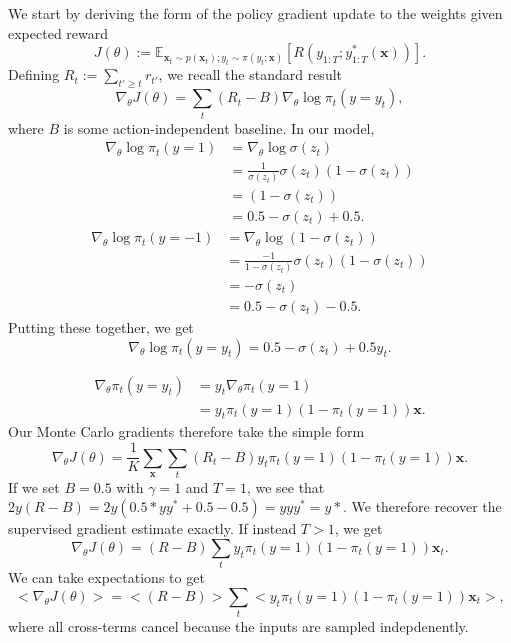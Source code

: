\documentclass{article}
\renewcommand\b\bm
\renewcommand\b\bm
\begin{document}
We start by deriving the form of the policy gradient update to the weights given expected reward
\begin{equation}
    J(\theta) := \mathbb{E}_{\b{x}_t \sim p(\b{x}_t); y_t \sim \pi(y_t; \b{x})} \left [ R(y_{1:T} ; y^*_{1:T}(\b{x})) \right ].
\end{equation}
Defining $R_t := \sum_{t' \geq t} r_{t'}$, we recall the standard result
\begin{equation}
    \nabla_\theta J(\theta) = \sum_t (R_t - B) \nabla_\theta \log \pi_t(y = y_t),
\end{equation}
where $B$ is some action-independent baseline.
In our model,
\begin{align}
    \nabla_\theta \log \pi_t(y = 1) &= \nabla_\theta \log \sigma(z_t) \\
    &= \frac{1}{\sigma(z_t)} \sigma(z_t) (1-\sigma(z_t))\\
    &=  (1-\sigma(z_t))\\
    &= 0.5 -\sigma(z_t) + 0.5.
\end{align}
\begin{align}
    \nabla_\theta \log \pi_t(y = -1) &= \nabla_\theta \log (1 - \sigma(z_t))\\
    &= \frac{-1}{1 - \sigma(z_t)} \sigma(z_t) (1-\sigma(z_t))\\
    &=  -\sigma(z_t)\\
    &= 0.5 -\sigma(z_t) - 0.5.
\end{align}
Putting these together, we get
\begin{equation}
    \nabla_\theta \log \pi_t(y = y_t) = 0.5-\sigma(z_t)+0.5 y_t.
\end{equation}

\begin{align}
    \nabla_\theta \pi_t(y = y_t) &= y_t \nabla_\theta \pi_t(y = 1)\\
    &= y_t \pi_t(y = 1) (1-\pi_t(y = 1)) \b{x}.
\end{align}
Our Monte Carlo gradients therefore take the simple form
\begin{equation}
    \nabla_\theta J(\theta) = \frac{1}{K} \sum_{\b{x}} \sum_t (R_t - B) y_t \pi_t(y = 1) (1-\pi_t(y = 1)) \b{x}.
\end{equation}
If we set $B = 0.5$ with $\gamma = 1$ and $T = 1$, we see that $2 y (R - B) = 2 y (0.5*y y^* +0.5 - 0.5) = yyy^*=y*$.
We therefore recover the supervised gradient estimate exactly.
If instead $T > 1$, we get
\begin{equation}
    \nabla_\theta J(\theta) =  (R - B) \sum_t y_t \pi_t(y = 1) (1-\pi_t(y = 1)) \b{x}_t.
\end{equation}
We can take expectations to get
\begin{equation}
    < \nabla_\theta J(\theta) > =  <(R - B)> \sum_t <y_t \pi_t(y = 1) (1-\pi_t(y = 1)) \b{x}_t>,
\end{equation}
where all cross-terms cancel because the inputs are sampled indepdenently.
\end{document}
